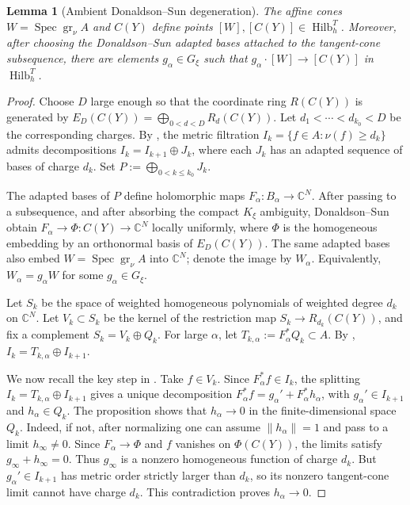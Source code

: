 \documentclass[11pt]{amsart}
\newtheorem{lemma}[theorem]{Lemma}
\theoremstyle{definition}
\theoremstyle{remark}
\begin{document}
\begin{lemma}[Ambient Donaldson--Sun degeneration]
\label{lem:ambient-dsii-degeneration}
The affine cones $W=\operatorname{Spec}\operatorname{gr}_\nu A$ and $C(Y)$
define points $[W],[C(Y)]\in\operatorname{Hilb}_h^T$. Moreover, after choosing
the Donaldson--Sun adapted bases \cite[Section~3.2]{DSII} attached to the tangent-cone subsequence, there are
elements $g_\alpha\in G_\xi$ such that
$g_\alpha\cdot[W]\to[C(Y)]$ in $\operatorname{Hilb}_h^T$.
\end{lemma}

\begin{proof}
Choose $D$ large enough so that the coordinate ring $R(C(Y))$ is generated by
$E_D(C(Y))=\bigoplus_{0<d<D}R_d(C(Y))$. Let
$d_1<\cdots<d_{k_0}<D$ be the corresponding charges. By
\cite[Proposition~3.14]{DSII}, the metric filtration
$I_k=\{f\in A:\nu(f)\geq d_k\}$ admits decompositions
$I_k=I_{k+1}\oplus J_k$, where each $J_k$ has an adapted sequence of bases of
charge $d_k$. Set $P:=\bigoplus_{0<k\leq k_0}J_k$.

The adapted bases of $P$ define holomorphic maps
$F_\alpha:B_\alpha\to\mathbb C^N$. After passing to a subsequence, and after
absorbing the compact $K_\xi$ ambiguity, Donaldson--Sun obtain
$F_\alpha\to\Phi:C(Y)\to\mathbb C^N$ locally uniformly, where $\Phi$ is the
homogeneous embedding by an orthonormal basis of $E_D(C(Y))$. The same adapted
bases also embed $W=\operatorname{Spec}\operatorname{gr}_\nu A$ into
$\mathbb C^N$; denote the image by $W_\alpha$. Equivalently,
$W_\alpha=g_\alpha W$ for some $g_\alpha\in G_\xi$.

Let $S_k$ be the space of weighted homogeneous polynomials of weighted degree
$d_k$ on $\mathbb C^N$. Let $V_k\subset S_k$ be the kernel of the restriction
map $S_k\to R_{d_k}(C(Y))$, and fix a complement $S_k=V_k\oplus Q_k$. For
large $\alpha$, let $T_{k,\alpha}:=F_\alpha^*Q_k\subset A$. By
\cite[Lemma~3.15]{DSII}, $I_k=T_{k,\alpha}\oplus I_{k+1}$.

We now recall the key step in \cite[Proposition~3.16]{DSII}. Take
$f\in V_k$. Since $F_\alpha^*f\in I_k$, the splitting
$I_k=T_{k,\alpha}\oplus I_{k+1}$ gives a unique decomposition
$F_\alpha^*f=g_\alpha'+F_\alpha^*h_\alpha$, with
$g_\alpha'\in I_{k+1}$ and $h_\alpha\in Q_k$. The proposition shows that
$h_\alpha\to0$ in the finite-dimensional space $Q_k$. Indeed, if not, after
normalizing one can assume $\|h_\alpha\|=1$ and pass to a limit
$h_\infty\neq0$. Since $F_\alpha\to\Phi$ and $f$ vanishes on $\Phi(C(Y))$, the
limits satisfy $g_\infty+h_\infty=0$. Thus $g_\infty$ is a nonzero homogeneous
function of charge $d_k$. But $g_\alpha'\in I_{k+1}$ has metric order
strictly larger than $d_k$, so its nonzero tangent-cone limit cannot have charge
$d_k$. This contradiction proves $h_\alpha\to0$.


\end{proof}
\end{document}
